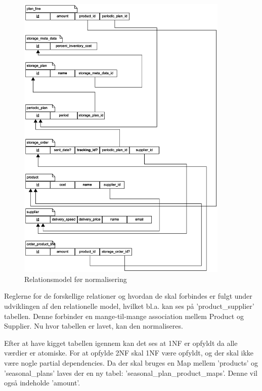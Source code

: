 \begin{figure}[H]
    \centering
    \includegraphics[width=0.9\textwidth]{figures/krav/relation_model_0th_normalization.eps}
    \caption{Relationsmodel før normalisering}
    \label{fig:relational_model_0}
\end{figure}

Reglerne for de forskellige relationer og hvordan de skal forbindes er fulgt under udviklingen af den relationelle model, hvilket bl.a. kan ses på 'product\_supplier' tabellen. Denne forbinder en mange-til-mange association mellem Product og Supplier. 
Nu hvor tabellen er lavet, kan den normaliseres.

Efter at have kigget tabellen igennem kan det ses at 1NF er opfyldt da alle værdier er atomiske.
For at opfylde 2NF skal 1NF være opfyldt, og der skal ikke være nogle partial dependencies. Da der skal bruges en Map mellem 'products' og 'seasonal\_plans' laves der en ny tabel: 'seasonal\_plan\_product\_maps'. Denne vil også indeholde 'amount'.

